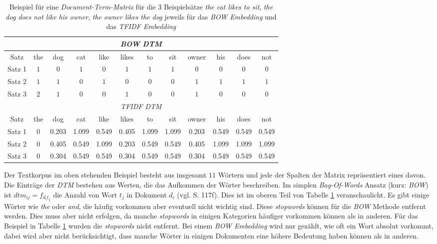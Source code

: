 \documentclass[a4paper,11pt]{article}
\begin{document}
\begin{table}[ht]
\begin{center}
    

\begin{tabular}{|c||ccccccccccc|}
\hline
\multicolumn{12}{|c|}{\textit{BOW} \textit{DTM}} \\
\hline 
   Satz   & the & dog & cat & like & likes &  to & sit  & owner & his &  does & not \\
      \hline
Satz 1 & $1$ & $0$ & $1$ & $0$ & $1$ & $1$ & $1$ & $0$ & $0$ &  $0$ & $0$ \\
Satz 2 & $1$ & $1$ & $0$ & $1$ & $0$ & $0$ & $0$ & $1$ & $1$ &  $1$ & $1$ \\
Satz 3 & $2$ & $1$ & $0$ & $0$ & $1$ & $0$ & $0$ & $1$ & $0$ &  $0$ & $0$ \\

\hline

\multicolumn{12}{|c|}{\textit{TFIDF} \textit{DTM}} \\
\hline 
   Satz   & the & dog & cat & like & likes &  to & sit  & owner & his &  does & not \\
      \hline
Satz $1$ & 0 & 0.203 & 1.099 & 0.549 & 0.405 & 1.099 & 1.099 & 0.203 & 0.549 & 0.549 & 0.549 \\ 
Satz  $2$ & 0 & 0.405 & 0.549 & 1.099 & 0.203 & 0.549 & 0.549 & 0.405 & 1.099 & 1.099 & 1.099 \\ 
Satz $3$ & 0 & 0.304 & 0.549 & 0.549 & 0.304 & 0.549 & 0.549 & 0.304 & 0.549 & 0.549 & 0.549 \\  
\hline
\end{tabular}
\end{center}{}
\caption{Beispiel für eine \textit{Document-Term-Matrix} für die $3$ Beispielsätze \textit{the cat likes to sit}, \textit{the dog does not like his owner}, \textit{the owner likes the dog} jeweils für das \textit{BOW Embedding} und das \textit{TFIDF Embedding} }  
\label{tab:BOWExample}

\end{table}

Der Textkorpus im oben stehenden Beispiel besteht aus insgesamt $11$ Wörtern und jede der Spalten der Matrix repräsentiert eines davon.
Die Einträge der \textit{DTM} bestehen aus Werten, die das Aufkommen der Wörter beschreiben. Im simplen \textit{Bag-Of-Words} Ansatz (kurz: \textit{BOW}) ist $dtm_{ij} = f_{d_i t_j}$ die Anzahl von Wort $t_j$ in Dokument $d_i$ (vgl. \cite{deepEssentials} S. 117f). Dies ist im oberen Teil von Tabelle \ref{tab:BOWExample} veranschaulicht. Es gibt einige Wörter wie \textit{the} oder \textit{and}, die häufig vorkommen aber eventuell nicht wichtig sind. Diese \textit{stopwords} können für die \textit{BOW} Methode entfernt werden. Dies muss aber nicht erfolgen, da manche \textit{stopwords} in einigen Kategorien häufiger vorkommen können als in anderen. Für das Beispiel in Tabelle \ref{tab:BOWExample} wurden die \textit{stopwords} nicht entfernt.
Bei einem \textit{BOW Embedding} wird nur gezählt, wie oft ein Wort absolut vorkommt, dabei wird aber nicht berücksichtigt, dass manche Wörter in einigen Dokumenten eine höhere Bedeutung haben können als in anderen. \\
\end{document}
